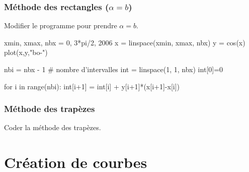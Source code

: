 \begin{frame}[fragile]
\frametitle{Méthode des rectangles ($\alpha=b$)}

Modifier le programme pour prendre $\alpha=b$.
\begin{GrayBox}[0.85\textwidth]
\begin{verbatimtab}[3]
xmin, xmax, nbx = 0, 3*pi/2, 2006
x = linspace(xmin, xmax, nbx)
y = cos(x)
plot(x,y,"bo-")

nbi = nbx - 1 # nombre d'intervalles
int = linspace(1, 1, nbx)
int[0]=0

for i in range(nbi):
    int[i+1] = int[i] + y[i+1]*(x[i+1]-x[i])
\end{verbatimtab}
\end{GrayBox}

\end{frame}

\begin{frame}[fragile]
\frametitle{Méthode des trapèzes}

Coder la méthode des trapèzes.
\vspace{7cm}

\end{frame}

\section{Création de courbes} 


